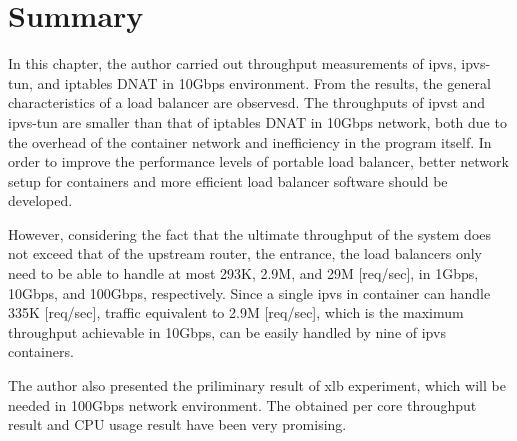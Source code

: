 \FloatBarrier

\section{Summary}

In this chapter, the author carried out throughput measurements of ipvs, ipvs-tun, and iptables DNAT in 10Gbps environment.
From the results, the general characteristics of a load balancer are observesd.
The throughputs of ipvst and ipvs-tun are smaller than that of iptables DNAT in 10Gbps network, both due to the overhead of the container network and inefficiency in the program itself.
In order to improve the performance levels of portable load balancer, better network setup for containers and more efficient load balancer software should be developed.

However, considering the fact that the ultimate throughput of the system does not exceed that of the upstream router, the entrance, 
the load balancers only need to be able to handle at most 293K, 2.9M, and 29M [req/sec], in 1Gbps, 10Gbps, and 100Gbps, respectively.
Since a single ipvs in container can handle 335K [req/sec], traffic equivalent to 2.9M [req/sec], which is the maximum throughput achievable in 10Gbps, can be easily handled by nine of ipvs containers.

The author also presented the priliminary result of xlb experiment, which will be needed in 100Gbps network environment.
The obtained per core throughput result and CPU usage result have been very promising.

